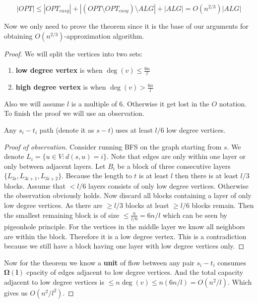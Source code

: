 $$
|OPT| \leq |OPT_{easy}| + |(OPT \setminus OPT_{easy}) \setminus ALG| + |ALG| = O(n^{2/3}) |ALG|
$$

Now we only need to prove the theorem since it is the base of our arguments for obtaining $O(n^{2/3})$-approximation algorithm.

\begin{proof}
	We will split the vertices into two sets:
	
	\begin{enumerate}
		\item \textbf{low degree vertex} is when $\deg(v) \leq \frac{6 n}{l}$
		\item \textbf{high degree vertex} is when $\deg(v) > \frac{6 n}{l}$
	\end{enumerate}
	
	Also we will assume $l$ is a multiple of 6. Otherwise it get lost in the $O$ notation. To finish the proof we will use an observation.
	
	\begin{observ}
		Any $s_{i}-t_{i}$ path (denote it as $s-t$) uses at least $l/6$ low degree vertices.
	\end{observ}
	
	\begin{proof}[Proof of observation]
		Consider running BFS on the graph starting from $s$. We denote $L_{i} = \{u \in V : d(s,u) = i\}$. Note that edges are only within one layer or only between adjacent layers. Let $B_{i}$ be a block of three consecutive layers $\{L_{3i}, L_{3i+1}, L_{3i+2}\}$. Because the length to $t$ is at least $l$ then there is at least $l/3$ blocks. Assume that $< l/6$ layers consists of only low degree vertices. Otherwise the observation obviously holds. Now discard all blocks containing a layer of only low degree vertices. As there are $\geq l/3$ blocks at least $\geq l/6$ blocks remain. Then the smallest remaining block is of size $\leq \frac{n}{l/6} = 6n/l$ which can be seen by pigeonhole principle. For the vertices in the middle layer we know all neighbors are within the block. Therefore it is a low degree vertex. This is a contradiction because we still have a block having one layer with low degree vertices only.
	\end{proof}
	
	Now for the theorem we know a \textbf{unit} of flow between any pair $s_{i}-t_{i}$ consumes $\mathbf{\Omega(l)}$ cpacity of edges adjacent to low degree vertices. And the total capacity adjacent to low degree vertices is $\leq n \deg(v) \leq n (6n/l) = O(n^2/l)$. Which gives us $O(n^2/l^2)$.
\end{proof}

